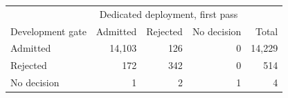 \begin{tabular}{lrrrr}
\toprule
 & \multicolumn{3}{c}{Dedicated deployment, first pass} & \\
Development gate & Admitted & Rejected & No decision & Total \\
\midrule
Admitted & 14,103 & 126 & 0 & 14,229 \\
Rejected & 172 & 342 & 0 & 514 \\
No decision & 1 & 2 & 1 & 4 \\
\bottomrule
\end{tabular}
